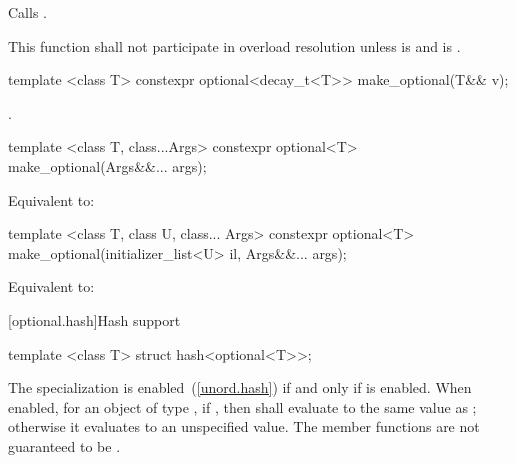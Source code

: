 \begin{itemdescr}
\pnum
\effects
Calls .

\pnum
\remarks This function shall not participate in overload resolution
unless  is  and
 is .
\end{itemdescr}

%
\begin{itemdecl}
template <class T> constexpr optional<decay_t<T>> make_optional(T&& v);
\end{itemdecl}

\begin{itemdescr}
\pnum
\returns
{}.
\end{itemdescr}

%
\begin{itemdecl}
template <class T, class...Args>
  constexpr optional<T> make_optional(Args&&... args);
\end{itemdecl}

\begin{itemdescr}
\pnum
\effects Equivalent to: 
\end{itemdescr}

%
\begin{itemdecl}
template <class T, class U, class... Args>
  constexpr optional<T> make_optional(initializer_list<U> il, Args&&... args);
\end{itemdecl}

\begin{itemdescr}
\pnum
\effects Equivalent to: 
\end{itemdescr}

[optional.hash]{Hash support}

%
\begin{itemdecl}
template <class T> struct hash<optional<T>>;
\end{itemdecl}

\begin{itemdescr}
\pnum
The specialization  is enabled~(\ref{unord.hash})
if and only if  is enabled.
When enabled, for an object  of type ,
if , then 
shall evaluate to the same value as ;
otherwise it evaluates to an unspecified value.
The member functions are not guaranteed to be .
\end{itemdescr}


